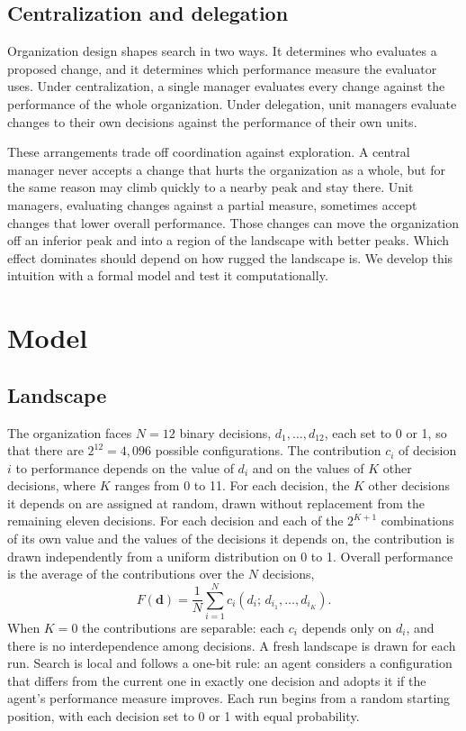 \documentclass[11pt]{article}
\begin{document}
\subsection{Centralization and delegation}

Organization design shapes search in two ways. It determines who evaluates a proposed change, and it determines which performance measure the evaluator uses. Under centralization, a single manager evaluates every change against the performance of the whole organization. Under delegation, unit managers evaluate changes to their own decisions against the performance of their own units.

These arrangements trade off coordination against exploration. A central manager never accepts a change that hurts the organization as a whole, but for the same reason may climb quickly to a nearby peak and stay there. Unit managers, evaluating changes against a partial measure, sometimes accept changes that lower overall performance. Those changes can move the organization off an inferior peak and into a region of the landscape with better peaks. Which effect dominates should depend on how rugged the landscape is. We develop this intuition with a formal model and test it computationally.

\section{Model}

\subsection{Landscape}

The organization faces $N = 12$ binary decisions, $d_1, \dots, d_{12}$, each set to 0 or 1, so that there are $2^{12} = 4{,}096$ possible configurations. The contribution $c_i$ of decision $i$ to performance depends on the value of $d_i$ and on the values of $K$ other decisions, where $K$ ranges from 0 to 11. For each decision, the $K$ other decisions it depends on are assigned at random, drawn without replacement from the remaining eleven decisions. For each decision and each of the $2^{K+1}$ combinations of its own value and the values of the decisions it depends on, the contribution is drawn independently from a uniform distribution on 0 to 1. Overall performance is the average of the contributions over the $N$ decisions,
\begin{equation}
F(\mathbf{d}) = \frac{1}{N}\sum_{i=1}^{N} c_i\left(d_i;\, d_{i_1}, \dots, d_{i_K}\right).
\end{equation}
When $K = 0$ the contributions are separable: each $c_i$ depends only on $d_i$, and there is no interdependence among decisions. A fresh landscape is drawn for each run. Search is local and follows a one-bit rule: an agent considers a configuration that differs from the current one in exactly one decision and adopts it if the agent's performance measure improves. Each run begins from a random starting position, with each decision set to 0 or 1 with equal probability.
\end{document}
